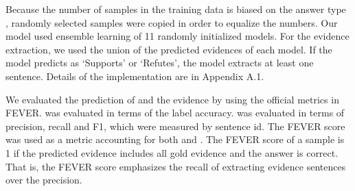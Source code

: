 \documentclass[11pt,a4paper]{article}
\theoremstyle{definition}
\begin{document}
	Because the number of samples in the training data is biased on the answer type , randomly selected samples were copied in order to equalize the numbers. 
	Our model used ensemble learning of 11 randomly initialized models. For the evidence extraction, we used the union of the predicted evidences of each model. 
	If the model predicts  as `Supports' or `Refutes', the model extracts at least one sentence.
	Details of the implementation are in Appendix A.1.

	We evaluated the prediction of  and the evidence  by using the official metrics in FEVER.  was evaluated in terms of the label accuracy.  was evaluated in terms of precision, recall and F1, which were measured by sentence id. The FEVER score was used as a metric accounting for both  and . The FEVER score of a sample is 1 if the predicted evidence includes all gold evidence and the answer is correct. That is, the FEVER score emphasizes the recall of extracting evidence sentences over the precision.
\end{document}
